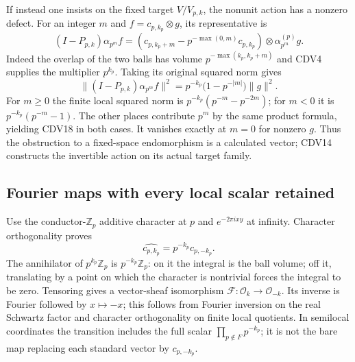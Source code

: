 If instead one insists on the fixed target $V/V_{p,k}$, the
nonunit action has a nonzero defect. For an integer $m$ and
$f=c_{p,k_p}\otimes g$, its representative is
\begin{equation}\tag{CDV17}
 (I-P_{p,k})\alpha_{p^m}f
 =\left(c_{p,k_p+m}-p^{-\max(0,m)}c_{p,k_p}\right)
                        \otimes\alpha_{p^m}^{(p)}g.
\end{equation}
Indeed the overlap of the two balls has volume
$p^{-\max(k_p,k_p+m)}$ and CDV4 supplies the multiplier
$p^{k_p}$. Taking its original squared norm gives
\begin{equation}\tag{CDV18}
 \|(I-P_{p,k})\alpha_{p^m}f\|^2
 =p^{-k_p}\bigl(1-p^{-|m|}\bigr)\|g\|^2.
\end{equation}
For $m\ge0$ the finite local squared norm is
$p^{-k_p}(p^{-m}-p^{-2m})$; for $m<0$ it is
$p^{-k_p}(p^{-m}-1)$. The other places contribute $p^m$
by the same product formula, yielding CDV18 in both cases.
It vanishes exactly at $m=0$ for nonzero $g$. Thus the
obstruction to a fixed-space endomorphism is a calculated vector;
CDV14 constructs the invertible action on its actual target family.

\subsection{Fourier maps with every local scalar retained}

Use the conductor-$\mathbb Z_p$ additive character at $p$ and
$e^{-2\pi ixy}$ at infinity. Character orthogonality proves
\begin{equation}\tag{CDV19}
 \widehat{c_{p,k_p}}=p^{-k_p}c_{p,-k_p}.
\end{equation}
The annihilator of $p^{k_p}\mathbb Z_p$ is
$p^{-k_p}\mathbb Z_p$: on it the integral is the ball volume;
off it, translating by a point on which the character is nontrivial
forces the integral to be zero. Tensoring gives a vector-sheaf
isomorphism $\mathcal F:\mathcal O_k\to\mathcal O_{-k}$.
Its inverse is Fourier followed by $x\mapsto-x$; this follows
from Fourier inversion on the real Schwartz factor and character
orthogonality on finite local quotients. In semilocal coordinates
the transition includes the full scalar
$\prod_{p\notin F}p^{-k_p}$; it is not the bare map replacing
each standard vector by $c_{p,-k_p}$.

